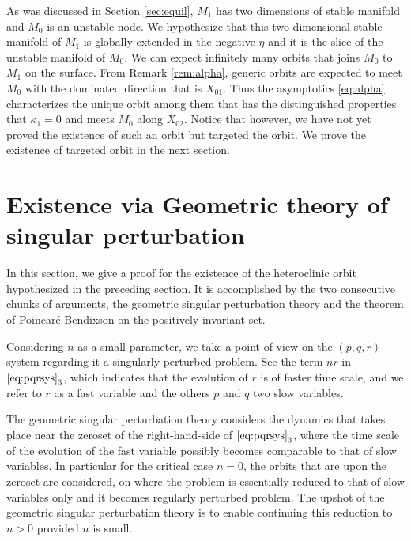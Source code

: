 \documentclass[a4paper,11pt]{article}
\begin{document}
As was discussed in Section \ref{sec:equil}, $M_1$ has two dimensions of stable manifold and $M_0$ is an unstable node. We hypothesize that this two dimensional stable manifold of $M_1$ is globally extended in the negative $\eta$ and it is the slice of the unstable manifold of $M_0$. We can expect infinitely many orbits that joins $M_0$ to $M_1$ on the surface. From Remark \ref{rem:alpha}, generic orbits are expected to meet $M_0$ with the dominated direction that is $X_{01}$. Thus the asymptotics \eqref{eq:alpha} characterizes the unique orbit among them that has the distinguished properties that $\kappa_1=0$ and meets $M_0$ along $X_{02}$. Notice that however, we have not yet proved the existence of such an orbit but targeted the orbit. We prove the existence of targeted orbit in the next section.

\section{Existence via Geometric theory of singular perturbation}
In this section, we give a proof for the existence of the heteroclinic orbit hypothesized in the preceding section. It is accomplished by the two consecutive chunks of arguments, the geometric singular perturbation theory and the theorem of Poincar\'e-Bendixson on the positively invariant set.

Considering $n$ as a small parameter, we take a point of view on the $(p,q,r)$-system regarding it a singularly perturbed problem. See the term $n\dot{r}$ in $\eqref{eq:pqrsys}_3$, which indicates that the evolution of $r$ is of faster time scale, and we refer to $r$ as a fast variable and the others $p$ and $q$ two slow variables.

The geometric singular perturbation theory considers the dynamics that takes place near the zeroset of the right-hand-side of $\eqref{eq:pqrsys}_3$, where the time scale of the evolution of the fast variable possibly becomes comparable to that of slow variables. In particular for the critical case $n=0$, the orbits that are upon the zeroset are considered, on where the problem is essentially reduced to that of slow variables only and it becomes regularly perturbed problem. The upshot of the geometric singular perturbation theory is to enable continuing this reduction to $n>0$ provided $n$ is small. 
\end{document}
